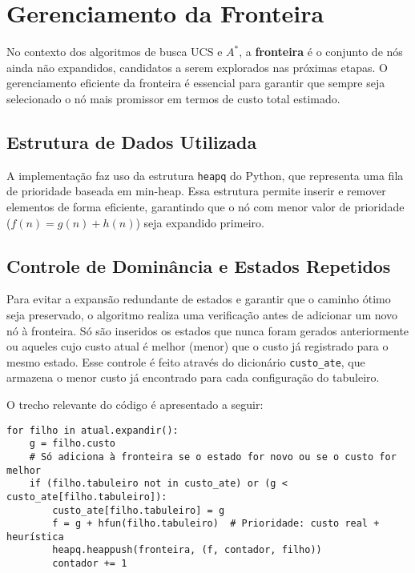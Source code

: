 \section{Gerenciamento da Fronteira}  
  
No contexto dos algoritmos de busca UCS e $A^*$, a \textbf{fronteira} é o conjunto de nós ainda não expandidos, candidatos a serem explorados nas próximas etapas. O gerenciamento eficiente da fronteira é essencial para garantir que sempre seja selecionado o nó mais promissor em termos de custo total estimado.   
  
\subsection{Estrutura de Dados Utilizada}  
  
A implementação faz uso da estrutura \texttt{heapq} do Python, que representa uma fila de prioridade baseada em min-heap. Essa estrutura permite inserir e remover elementos de forma eficiente, garantindo que o nó com menor valor de prioridade ($f(n) = g(n) + h(n)$) seja expandido primeiro.  
  
\subsection{Controle de Dominância e Estados Repetidos}  
  
Para evitar a expansão redundante de estados e garantir que o caminho ótimo seja preservado, o algoritmo realiza uma verificação antes de adicionar um novo nó à fronteira. Só são inseridos os estados que nunca foram gerados anteriormente ou aqueles cujo custo atual é melhor (menor) que o custo já registrado para o mesmo estado. Esse controle é feito através do dicionário \texttt{custo\_ate}, que armazena o menor custo já encontrado para cada configuração do tabuleiro.  
  
O trecho relevante do código é apresentado a seguir:  
  
\begin{verbatim}  
for filho in atual.expandir():  
    g = filho.custo  
    # Só adiciona à fronteira se o estado for novo ou se o custo for melhor  
    if (filho.tabuleiro not in custo_ate) or (g < custo_ate[filho.tabuleiro]):  
        custo_ate[filho.tabuleiro] = g  
        f = g + hfun(filho.tabuleiro)  # Prioridade: custo real + heurística  
        heapq.heappush(fronteira, (f, contador, filho))  
        contador += 1  
\end{verbatim}  
  
